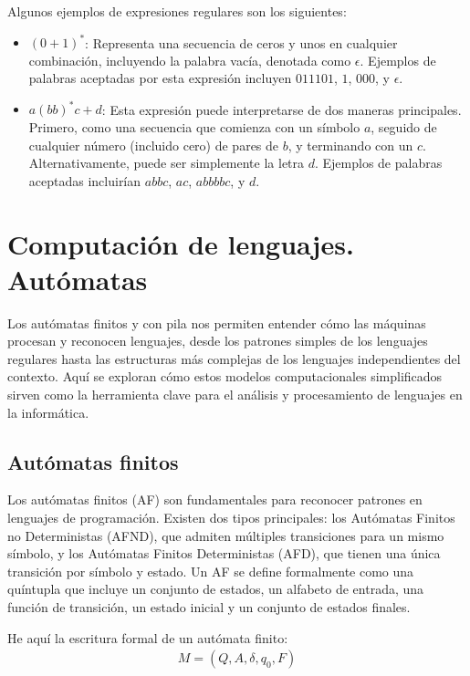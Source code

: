 \noindent
Algunos ejemplos de expresiones regulares son los siguientes:
\begin{itemize}
    \item $(0+1)^*$: Representa una secuencia de ceros y unos en cualquier combinación, incluyendo la palabra vacía, denotada como $\epsilon$. Ejemplos de palabras aceptadas por esta expresión incluyen $011101$, $1$, $000$, y $\epsilon$.
    \item $a(bb)^*c+d$: Esta expresión puede interpretarse de dos maneras principales. Primero, como una secuencia que comienza con un símbolo $a$, seguido de cualquier número (incluido cero) de pares de $b$, y terminando con un $c$. Alternativamente, puede ser simplemente la letra $d$. Ejemplos de palabras aceptadas incluirían $abbc$, $ac$, $abbbbc$, y $d$.
\end{itemize}



\section{Computación de lenguajes. Autómatas}\label{section:automat}
Los autómatas finitos y con pila nos permiten entender cómo las máquinas procesan y reconocen lenguajes, desde los patrones simples de los lenguajes regulares hasta las estructuras más complejas de los lenguajes independientes del contexto. Aquí se exploran cómo estos modelos computacionales simplificados sirven como la herramienta clave para el análisis y procesamiento de lenguajes en la informática.

\subsection{Autómatas finitos}\label{subsection:AF}
Los autómatas finitos (AF) son fundamentales para reconocer patrones en lenguajes de programación. Existen dos tipos principales: los Autómatas Finitos no Deterministas (AFND), que admiten múltiples transiciones para un mismo símbolo, y los Autómatas Finitos Deterministas (AFD), que tienen una única transición por símbolo y estado. Un AF se define formalmente como una quíntupla que incluye un conjunto de estados, un alfabeto de entrada, una función de transición, un estado inicial y un conjunto de estados finales.

\noindent
He aquí la escritura formal de un autómata finito:
\begin{align*}
    M = (Q,A,\delta,q_0,F)
\end{align*}

